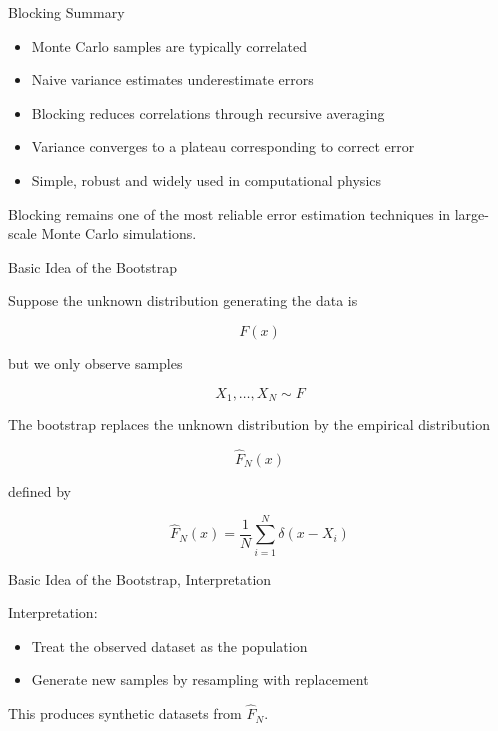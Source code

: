 \documentclass{beamer}
\begin{document}
\begin{frame}{Blocking Summary}

  \begin{itemize}

  \item Monte Carlo samples are typically correlated
  \item Naive variance estimates underestimate errors
  \item Blocking reduces correlations through recursive averaging
  \item Variance converges to a plateau corresponding to correct error
  \item Simple, robust and widely used in computational physics

  \end{itemize}

  Blocking remains one of the most reliable error estimation techniques in large-scale Monte Carlo simulations.
\end{frame}



\begin{frame}{Basic Idea of the Bootstrap}

Suppose the unknown distribution generating the data is

\[
F(x)
\]

but we only observe samples

\[
X_1,\dots,X_N \sim F
\]

The bootstrap replaces the unknown distribution by the empirical distribution

\[
\hat{F}_N(x)
\]

defined by

\[
\hat{F}_N(x)=\frac{1}{N}\sum_{i=1}^{N}\delta(x-X_i)
\]

\end{frame}


\begin{frame}{Basic Idea of the Bootstrap, Interpretation}



Interpretation:

\begin{itemize}
\item Treat the observed dataset as the population
\item Generate new samples by resampling with replacement
\end{itemize}

This produces synthetic datasets from $\hat{F}_N$.
\end{frame}
\end{document}
